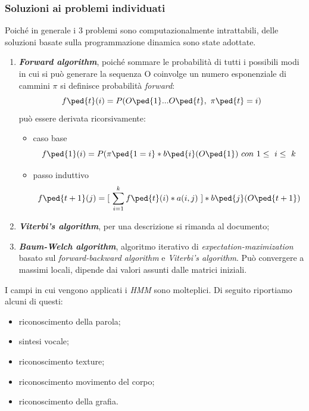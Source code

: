 \subsubsection*{Soluzioni ai problemi individuati\cite{8}}
\label{3.3.2.6}
Poiché in generale i 3 problemi sono computazionalmente intrattabili, delle soluzioni basate sulla \gls{programmazione dinamica} sono state adottate.
\begin{enumerate}
\item\textbf{\emph{Forward algorithm}}, poiché sommare le probabilità di tutti i possibili modi in cui si può generare la sequenza O coinvolge un numero esponenziale di cammini $\pi$ si definisce probabilità \emph{forward}:
\[ f\ped{t}(i)=P(O\ped{1}...O\ped{t},\ \pi\ped{t}=i)\]
può essere derivata ricorsivamente:
\begin{itemize}
\item caso base
\[f\ped{1}(i)=P(\pi\ped{1=i}*b\ped{i}(O\ped{1})\ con\ 1\le\ i\le\ k\]
\item passo induttivo
\[f\ped{t+1}(j)=[\ \sum\limits_{i=1}^k f\ped{t}(i)*a(i,j)\ ]*b\ped{j}(O\ped{t+1})\]
\end{itemize}
\item\textbf{\emph{Viterbi's algorithm}}, per una descrizione si rimanda al documento\cite{8};
\item\textbf{\emph{Baum-Welch algorithm}}, algoritmo iterativo di \emph{expectation-maximization} basato sul \emph{forward-backward algorithm} e \emph{Viterbi's algorithm}. Può convergere a massimi locali, dipende dai valori assunti dalle matrici iniziali.
\end{enumerate}
I campi in cui vengono applicati i \emph{HMM} sono molteplici. Di seguito riportiamo alcuni di questi:
\begin{itemize}
\item riconoscimento della parola;
\item sintesi vocale;
\item riconoscimento texture;
\item riconoscimento movimento del corpo;
\item riconoscimento della grafia.
\end{itemize}

